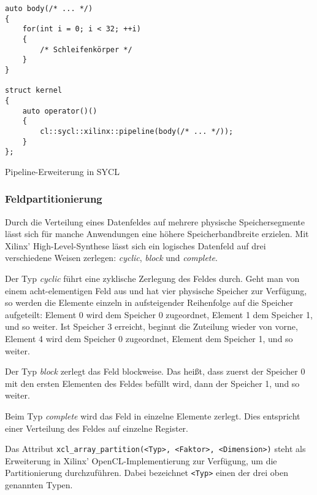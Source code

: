 \begin{code}
    \begin{verbatim}
auto body(/* ... */)
{
    for(int i = 0; i < 32; ++i)
    {
        /* Schleifenkörper */
    }
}

struct kernel
{
    auto operator()()
    {
        cl::sycl::xilinx::pipeline(body(/* ... */));
    }
};
    \end{verbatim}
    \caption{Pipeline-Erweiterung in SYCL}
    \label{sycl:erweiterungen:xilinx:pipeline:sycl}
\end{code}

\subsubsection{Feldpartitionierung}
\label{sycl:erweiterungen:xilinx:partitioning}

Durch die Verteilung eines Datenfeldes auf mehrere physische Speichersegmente
lässt sich für manche Anwendungen eine höhere Speicherbandbreite erzielen.
Mit Xilinx' High-Level-Synthese lässt sich ein logisches Datenfeld auf drei
verschiedene Weisen zerlegen: \textit{cyclic}, \textit{block} und
\textit{complete}. \cite[vgl.][16]{sdxpragma2019}

Der Typ \textit{cyclic} führt eine zyklische Zerlegung des Feldes durch. Geht
man von einem acht-elementigen Feld aus und hat vier physische Speicher zur
Verfügung, so werden die Elemente einzeln in aufsteigender Reihenfolge auf die
Speicher aufgeteilt: Element 0 wird dem Speicher 0 zugeordnet, Element 1 dem
Speicher 1, und so weiter. Ist Speicher 3 erreicht, beginnt die Zuteilung wieder
von vorne, Element 4 wird dem Speicher 0 zugeordnet, Element dem Speicher 1,
und so weiter. \cite[vgl.][17]{sdxpragma2019}

Der Typ \textit{block} zerlegt das Feld blockweise. Das heißt, dass zuerst der
Speicher 0 mit den ersten Elementen des Feldes befüllt wird, dann der Speicher
1, und so weiter. \cite[vgl.][17]{sdxpragma2019}

Beim Typ \textit{complete} wird das Feld in einzelne Elemente zerlegt. Dies
entspricht einer Verteilung des Feldes auf einzelne Register.
\cite[vgl.][17]{sdxpragma2019}

Das Attribut \texttt{xcl\_array\_partition(<Typ>, <Faktor>, <Dimension>)} steht
als Erweiterung in Xilinx' OpenCL-Implementierung zur Verfügung, um die
Partitionierung durchzuführen. Dabei bezeichnet \texttt{<Typ>} einen der drei
oben genannten Typen. \cite[vgl.][17]{sdxpragma2019}

